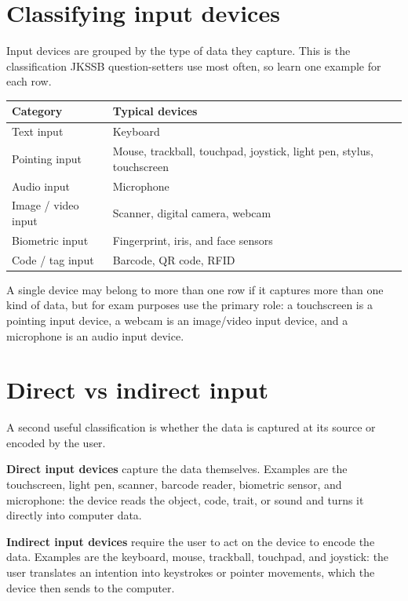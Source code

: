 \section{Classifying input devices}
Input devices are grouped by the type of data they capture. This is the
classification JKSSB question-setters use most often, so learn one example
for each row.

\begin{center}
\begin{tabular}{p{}p{}}
\toprule
\textbf{Category} & \textbf{Typical devices} \\
\midrule
Text input & Keyboard \\
Pointing input & Mouse, trackball, touchpad, joystick, light pen, stylus, touchscreen \\
Audio input & Microphone \\
Image / video input & Scanner, digital camera, webcam \\
Biometric input & Fingerprint, iris, and face sensors \\
Code / tag input & Barcode, QR code, RFID \\
\bottomrule
\end{tabular}
\end{center}

A single device may belong to more than one row if it captures more than one
kind of data, but for exam purposes use the primary role: a touchscreen is a
pointing input device, a webcam is an image/video input device, and a
microphone is an audio input device.

\section{Direct vs indirect input}
A second useful classification is whether the data is captured at its source
or encoded by the user.

\textbf{Direct input devices} capture the data themselves. Examples are the
touchscreen, light pen, scanner, barcode reader, biometric sensor, and
microphone: the device reads the object, code, trait, or sound and turns it
directly into computer data.

\textbf{Indirect input devices} require the user to act on the device to
encode the data. Examples are the keyboard, mouse, trackball, touchpad, and
joystick: the user translates an intention into keystrokes or pointer
movements, which the device then sends to the computer.

